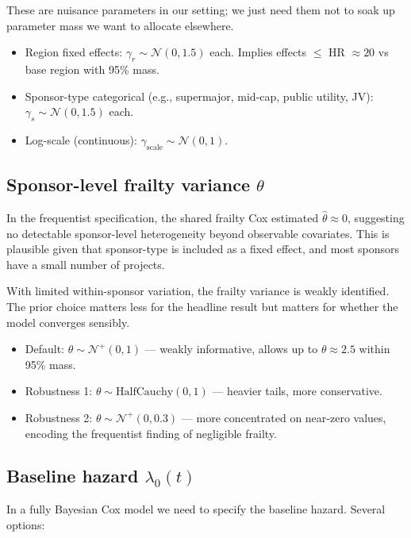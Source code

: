 \documentclass[11pt,a4paper]{article}
\newcommand{\N}{\mathcal{N}}
\newcommand{\HalfN}{\mathcal{N}^{+}}
\newcommand{\HalfC}{\mathrm{HalfCauchy}}
\begin{document}
These are nuisance parameters in our setting; we just need them not to soak up parameter mass we want to allocate elsewhere.

\begin{itemize}
  \item Region fixed effects: $\gamma_r \sim \N(0, 1.5)$ each. Implies effects $\le$ HR $\approx 20$ vs base region with 95\% mass.
  \item Sponsor-type categorical (e.g., supermajor, mid-cap, public utility, JV): $\gamma_s \sim \N(0, 1.5)$ each.
  \item Log-scale (continuous): $\gamma_{\text{scale}} \sim \N(0, 1)$.
\end{itemize}

\subsection{Sponsor-level frailty variance $\theta$}

In the frequentist specification, the shared frailty Cox estimated $\hat\theta \approx 0$, suggesting no detectable sponsor-level heterogeneity beyond observable covariates. This is plausible given that sponsor-type is included as a fixed effect, and most sponsors have a small number of projects.

\begin{rationale}
With limited within-sponsor variation, the frailty variance is weakly identified. The prior choice matters less for the headline result but matters for whether the model converges sensibly.
\end{rationale}

\begin{itemize}
  \item Default: $\theta \sim \HalfN(0, 1)$ --- weakly informative, allows up to $\theta \approx 2.5$ within 95\% mass.
  \item Robustness 1: $\theta \sim \HalfC(0, 1)$ --- heavier tails, more conservative.
  \item Robustness 2: $\theta \sim \HalfN(0, 0.3)$ --- more concentrated on near-zero values, encoding the frequentist finding of negligible frailty.
\end{itemize}

\subsection{Baseline hazard $\lambda_0(t)$}

In a fully Bayesian Cox model we need to specify the baseline hazard. Several options:
\end{document}

